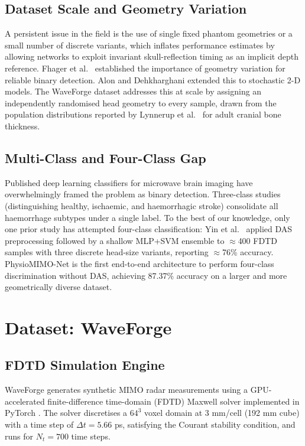 \documentclass[journal]{IEEEtran}
\begin{document}
\subsection{Dataset Scale and Geometry Variation}

A persistent issue in the field is the use of single fixed
phantom geometries or a small number of discrete variants,
which inflates performance estimates by allowing networks to
exploit invariant skull-reflection timing as an implicit depth
reference.  Fhager et al.\ \cite{Fhager2019} established the
importance of geometry variation for reliable binary detection.
Alon and Dehkharghani \cite{Alon2021} extended this to
stochastic 2-D models.  The WaveForge dataset addresses this
at scale by assigning an independently randomised head
geometry to every sample, drawn from the population
distributions reported by Lynnerup et al.\ \cite{Lynnerup2005}
for adult cranial bone thickness.

\subsection{Multi-Class and Four-Class Gap}

Published deep learning classifiers for microwave brain
imaging have overwhelmingly framed the problem as binary
detection.  Three-class studies (distinguishing healthy,
ischaemic, and haemorrhagic stroke) consolidate all
haemorrhage subtypes under a single label.  To the best of
our knowledge, only one prior study has attempted four-class
classification: Yin et al.\ \cite{Yin2021} applied DAS
preprocessing followed by a shallow MLP+SVM ensemble to
$\approx$400 FDTD samples with three discrete head-size
variants, reporting $\approx$76\% accuracy.  PhysioMIMO-Net
is the first end-to-end architecture to perform four-class
discrimination without DAS, achieving 87.37\% accuracy on a
larger and more geometrically diverse dataset.


\section{Dataset: WaveForge}
\label{sec:dataset}

\subsection{FDTD Simulation Engine}

WaveForge generates synthetic MIMO radar measurements using a
GPU-accelerated finite-difference time-domain (FDTD) Maxwell
solver \cite{Yee1966} implemented in PyTorch \cite{Paszke2019}.
The solver discretises a $64^3$ voxel domain at 3 mm/cell
(192 mm cube) with a time step of $\Delta t = 5.66$ ps,
satisfying the Courant stability condition, and runs for
$N_t = 700$ time steps.
\end{document}

